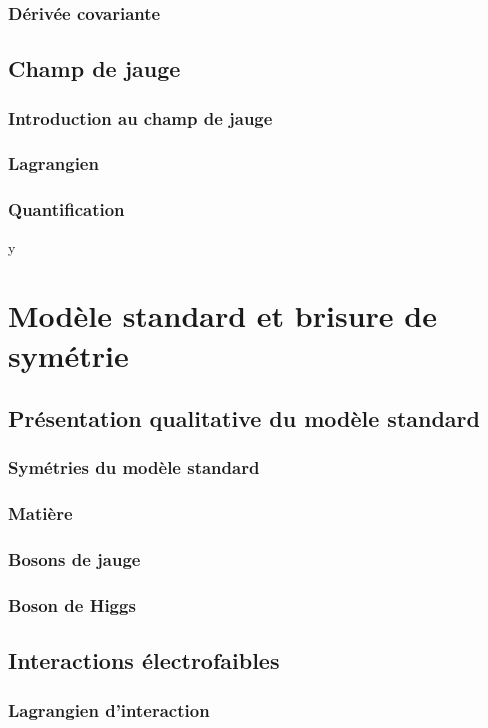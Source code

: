 \documentclass{article}
\begin{document}
			\subsubsection{Dérivée covariante}
			
		\subsection{Champ de jauge}
			\subsubsection{Introduction au champ de jauge}
			\subsubsection{Lagrangien}
			\subsubsection{Quantification}
	y
		
		\section{Modèle standard et brisure de symétrie}
		
			\subsection{Présentation qualitative du modèle standard}
				\subsubsection{Symétries du modèle standard}
				\subsubsection{Matière}
				\subsubsection{Bosons de jauge}
				\subsubsection{Boson de Higgs}
			\subsection{Interactions électrofaibles}
				\subsubsection{Lagrangien d'interaction}
\end{document}
